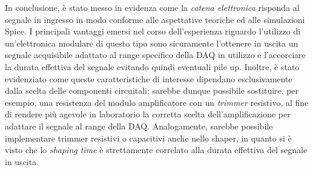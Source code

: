 \documentclass[a4paper,11pt]{article} %
\begin{document}
In conclusione, è stato messo in evidenza come la \textit{catena elettronica} risponda al segnale in ingresso in modo
conforme alle aspettative teoriche ed alle simulazioni Spice. I principali vantaggi emersi nel corso dell'esperienza
riguardo l'utilizzo di un'elettronica modulare di questo tipo sono sicuramente l'ottenere in uscita un segnale
acquisibile adattato al range specifico della DAQ in utilizzo e l'accorciare la durata effettiva del segnale evitando
quindi eventuali pile up. Inoltre, è stato evidenziato come queste caratteristiche di interesse dipendano esclusivamente
dalla scelta delle componenti circuitali: sarebbe dunque possibile sostituire, per esempio, una resistenza
del modulo amplificatore con un \textit{trimmer} resistivo, al fine di rendere più agevole in laboratorio la corretta
scelta dell'amplificazione per adattare il segnale al range della DAQ. Analogamente, sarebbe possibile implementare
trimmer resistivi o capacitivi anche nello shaper, in quanto si è visto che lo \textit{shaping time} è strettamente
correlato alla durata effettiva del segnale in uscita. 


\end{document}
